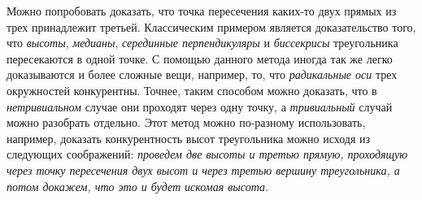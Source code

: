 \documentclass[14pt]{extarticle}
\theoremstyle{definition}
\theoremstyle{theorem}
\begin{document}
Можно попробовать доказать, что точка пересечения каких-то двух прямых из трех
принадлежит третьей. Классическим примером является доказательство
того, что \textit{высоты}, \textit{медианы}, \textit{серединные перпендикуляры} и
\textit{биссекрисы} треугольника пересекаются в одной точке.
С помощью данного метода иногда так же легко доказываются и более сложные вещи,
например, то, что \textit{радикальные оси} трех окружностей конкурентны. 
Точнее, таким способом можно доказать, что в \textit{нетривиальном} случае они 
проходят через одну точку, а \textit{тривиальный} случай можно разобрать
отдельно. Этот метод можно по-разному использовать, например, доказать
конкурентность высот треугольника можно исходя из следующих соображений: 
\textit{проведем две высоты и третью прямую, проходящую через точку пересечения
двух высот и через третью вершину треугольника, а потом докажем, что это и будет
искомая высота}.
\end{document}
